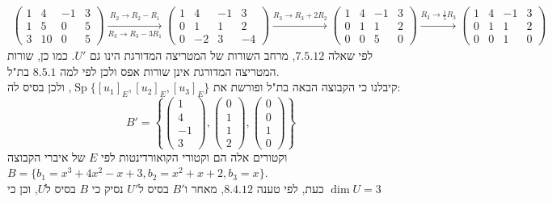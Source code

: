\documentclass{article}
\DeclareMathOperator\Sp{Sp}
\begin{document}
\begin{align*}
    \begin{pmatrix}
        1 & 4  & -1 & 3 \\
        1 & 5  & 0  & 5 \\
        3 & 10 & 0  & 5
    \end{pmatrix}
    \xrightarrow[R_3\rightarrow R_3-3R_1]{R_2\rightarrow R_2-R_1}
    \begin{pmatrix}
        1 & 4  & -1 & 3  \\
        0 & 1  & 1  & 2  \\
        0 & -2 & 3  & -4
    \end{pmatrix}
    \xrightarrow[]{R_3\rightarrow R_3+2R_2}
    \begin{pmatrix}
        1 & 4 & -1 & 3 \\
        0 & 1 & 1  & 2 \\
        0 & 0 & 5  & 0
    \end{pmatrix}
    \xrightarrow[]{R_3\rightarrow \frac{1}{5}R_3}
    \begin{pmatrix}
        1 & 4 & -1 & 3 \\
        0 & 1 & 1  & 2 \\
        0 & 0 & 1  & 0
    \end{pmatrix}
\end{align*}
לפי שאלה $7.5.12$, מרחב השורות של המטריצה המדורגת הינו גם $U'$. כמו כן, שורות המטריצה המדורגת אינן שורות אפס ולכן לפי למה $8.5.1$ בת"ל. \\
קיבלנו כי הקבוצה הבאה בת"ל ופורשת את $\Sp\{ [u_1]_E, [u_2]_E, [u_3]_E \}$, ולכן בסיס לה:
\[
    B'=\left\{
    \begin{pmatrix}
        1  \\
        4  \\
        -1 \\
        3
    \end{pmatrix},
    \begin{pmatrix}
        0 \\
        1 \\
        1 \\
        2
    \end{pmatrix},
    \begin{pmatrix}
        0 \\
        0 \\
        1 \\
        0
    \end{pmatrix}
    \right\}
\]
וקטורים אלה הם וקטורי הקואורדינטות לפי $E$ של איברי הקבוצה $B=\{b_1=x^3+4x^2-x+3, b_2=x^2+x+2, b_3=x\}$.\\
כעת, לפי טענה $8.4.12$, מאחר ו$B'$ בסיס ל$U'$ נסיק כי $B$ בסיס ל$U$,
וכן כי $\dim U=3$
\end{document}
